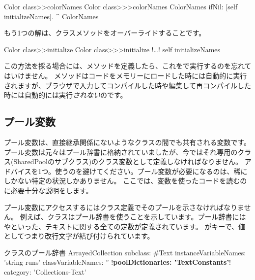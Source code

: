 \documentclass[a4paper,10pt,twoside]{book}
\begin{document}
\begin{method}[colorclasscolornames]{Color class>>colorNames}
Color class>>>colorNames	
	ColorNames ifNil: [self initializeNames].
	^ ColorNames
\end{method}	

もう1つの解は、クラスメソッドをオーバーライドすることです。

\begin{method}[colorclassinit]{Color class>>initialize}
Color class>>>initialize	
	!\ldots!
	self initializeNames
\end{method}	

\noindent
この方法を採る場合には、メソッドを定義したら、これをで実行するのを忘れてはいけません。
 メソッドはコードをメモリーにロードした時には自動的に実行されますが、ブラウザで入力してコンパイルした時や編集して再コンパイルした時には自動的には実行\emph{されない}のです。

\subsection{プール変数}
プール変数は、直接継承関係にないようなクラスの間でも共有される変数です。
プール変数は元々はプール辞書に格納されていましたが、今ではそれ専用のクラス(SharedPoolのサブクラス)のクラス変数として定義しなければなりません。
アドバイスを1つ。使うのを避けてください。プール変数が必要になるのは、稀にしかない特定の状況しかありません。
ここでは、変数を使ったコードを読むのに必要十分な説明をします。

プール変数にアクセスするにはクラス定義でそのプールを示さなければなりません。
例えば、クラスはプール辞書を使うことを示しています。プール辞書にはやといった、テキストに関する全ての定数が定義されています。
がキーで、値としてつまり改行文字が結び付けられています。

\begin{classdef}[textpooldict]{クラスのプール辞書}
ArrayedCollection subclass: #Text
        instanceVariableNames: 'string runs' 	
        classVariableNames: '' 	
        !\textbf{poolDictionaries: 'TextConstants'}!
        category: 'Collections-Text'
\end{classdef}
   
\end{document}
